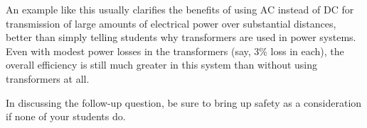 






An example like this usually clarifies the benefits of using AC instead of DC for transmission of large amounts of electrical power over substantial distances, better than simply telling students why transformers are used in power systems.  Even with modest power losses in the transformers (say, 3\% loss in each), the overall efficiency is still much greater in this system than without using transformers at all.

In discussing the follow-up question, be sure to bring up safety as a consideration if none of your students do.




